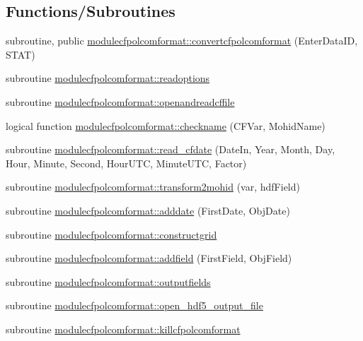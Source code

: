 \subsection*{Functions/\+Subroutines}
\begin{DoxyCompactItemize}
\item 
subroutine, public \mbox{\hyperlink{namespacemodulecfpolcomformat_a2792438e0105569c0bc2d1dc532a27b6}{modulecfpolcomformat\+::convertcfpolcomformat}} (Enter\+Data\+ID, S\+T\+AT)
\item 
subroutine \mbox{\hyperlink{namespacemodulecfpolcomformat_a4c4e63e132d65e031563f05fe3a94a6e}{modulecfpolcomformat\+::readoptions}}
\item 
subroutine \mbox{\hyperlink{namespacemodulecfpolcomformat_a4b22d491cfb2a95ce7441773203c2e7e}{modulecfpolcomformat\+::openandreadcffile}}
\item 
logical function \mbox{\hyperlink{namespacemodulecfpolcomformat_a555e71ed3c48d8786288c63a8f0aa501}{modulecfpolcomformat\+::checkname}} (C\+F\+Var, Mohid\+Name)
\item 
subroutine \mbox{\hyperlink{namespacemodulecfpolcomformat_a629c520b52ec9b466d91469b40321b35}{modulecfpolcomformat\+::read\+\_\+cfdate}} (Date\+In, Year, Month, Day, Hour, Minute, Second, Hour\+U\+TC, Minute\+U\+TC, Factor)
\item 
subroutine \mbox{\hyperlink{namespacemodulecfpolcomformat_a3d0d3ed8a29201140d8429b140242edc}{modulecfpolcomformat\+::transform2mohid}} (var, hdf\+Field)
\item 
subroutine \mbox{\hyperlink{namespacemodulecfpolcomformat_a06c01fa0bdcd286b18e4131ebf80a3fe}{modulecfpolcomformat\+::adddate}} (First\+Date, Obj\+Date)
\item 
subroutine \mbox{\hyperlink{namespacemodulecfpolcomformat_ae48cf997b8d44143cac43f824a76058d}{modulecfpolcomformat\+::constructgrid}}
\item 
subroutine \mbox{\hyperlink{namespacemodulecfpolcomformat_aeffcbf4718c74837ddf588179800f544}{modulecfpolcomformat\+::addfield}} (First\+Field, Obj\+Field)
\item 
subroutine \mbox{\hyperlink{namespacemodulecfpolcomformat_a5d472a387fb496b9a4ae576e445acaa3}{modulecfpolcomformat\+::outputfields}}
\item 
subroutine \mbox{\hyperlink{namespacemodulecfpolcomformat_aa08f9068cb50c9ebecda0e3eac54124c}{modulecfpolcomformat\+::open\+\_\+hdf5\+\_\+output\+\_\+file}}
\item 
subroutine \mbox{\hyperlink{namespacemodulecfpolcomformat_a3017fd95b8b5cbe08856f9644c9f6533}{modulecfpolcomformat\+::killcfpolcomformat}}
\end{DoxyCompactItemize}
